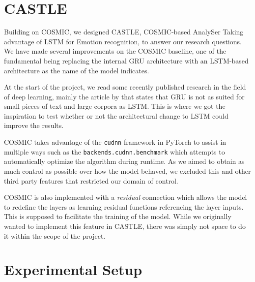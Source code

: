 \documentclass[nofilelist]{cslthse-msc}
\begin{document}

\section{CASTLE}
Building on COSMIC, we designed CASTLE, COSMIC-based AnalySer Taking advantage of LSTM for Emotion recognition, to answer our research questions. We have made several improvements on the COSMIC baseline, one of the fundamental being replacing the internal GRU architecture with an LSTM-based architecture as the name of the model indicates. 

At the start of the project, we read some recently published research in the field of deep learning, mainly the article by \citet{edseee.922172720200601} that states that GRU is not as suited for small pieces of text and large corpora as LSTM. This is where we got the inspiration to test whether or not the architectural change to LSTM could improve the results. 


COSMIC takes advantage of the \texttt{cudnn} framework in PyTorch to assist in multiple ways such as the \texttt{backends.cudnn.benchmark} which attempts to automatically optimize the algorithm during runtime. As we aimed to obtain as much control as possible over how the model behaved, we excluded this and other third party features that restricted our domain of control.  

COSMIC is also implemented with a \textit{residual} connection \citep{he2015deep} which allows the model to redefine the layers as learning residual functions referencing the layer inputs. This is supposed to facilitate the training of the model. While we originally wanted to implement this feature in CASTLE, there was simply not space to do it within the scope of the project. 










\section{Experimental Setup}
\end{document}
